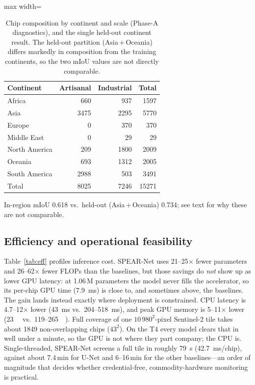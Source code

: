 \documentclass[review]{elsarticle}
\begin{document}
\begin{table}[t]
\centering
\caption{Chip composition by continent and scale (Phase-A diagnostics), and the single
held-out continent result. The held-out partition (Asia\,+\,Oceania) differs markedly in
composition from the training continents, so the two mIoU values are not directly comparable.}
\label{tab:gen}
\label{tab:region}
\small
\setlength{\tabcolsep}{6pt}
\begin{adjustbox}{max width=\linewidth}
\begin{tabular}{l r r r}
\toprule
Continent & Artisanal & Industrial & Total \\
\midrule
Africa        & \num{660}  & \num{937}  & \num{1597} \\
Asia          & \num{3475} & \num{2295} & \num{5770} \\
Europe        & \num{0}    & \num{370}  & \num{370}  \\
Middle East   & \num{0}    & \num{29}   & \num{29}   \\
North America & \num{209}  & \num{1800} & \num{2009} \\
Oceania       & \num{693}  & \num{1312} & \num{2005} \\
South America & \num{2988} & \num{503}  & \num{3491} \\
\midrule
Total         & \num{8025} & \num{7246} & \num{15271} \\
\bottomrule
\end{tabular}
\end{adjustbox}

\vspace{4pt}
\footnotesize In-region mIoU \num{0.618} vs.\ held-out (Asia\,+\,Oceania) \num{0.734};
see text for why these are not comparable.
\end{table}

\subsection{Efficiency and operational feasibility}\label{sec:results-eff}
Table~\ref{tab:eff} profiles inference cost. SPEAR-Net uses \num{21}--\num{25}$\times$ fewer
parameters and \num{26}--\num{62}$\times$ fewer FLOPs than the baselines, but those savings
do \emph{not} show up as lower GPU latency: at \num{1.06}\,M parameters the model never fills
the accelerator, so its per-chip GPU time (\SI{7.9}{\milli\second}) is close to, and
sometimes above, the baselines. The gain lands instead exactly where deployment is
constrained. CPU latency is \num{4.7}--\num{12}$\times$ lower (\SI{43}{\milli\second} vs.\
\SI{204}{}--\SI{518}{\milli\second}), and peak GPU memory is \num{5}--\num{11}$\times$ lower
(\SI{23}{\mega\byte} vs.\ \SI{119}{}--\SI{265}{\mega\byte}). Full coverage of one
$10\,980^2$-pixel Sentinel-2 tile takes about \num{1849} non-overlapping chips ($43^2$). On
the T4 every model clears that in well under a minute, so the GPU is not where they part
company; the CPU is. Single-threaded, SPEAR-Net screens a full tile in roughly
\SI{79}{\second} (\SI{42.7}{\milli\second}/chip), against about \num{7.4}\,min for U-Net and
\num{6}--\num{16}\,min for the other baselines---an order of magnitude that decides whether
credential-free, commodity-hardware monitoring is practical.
\end{document}
